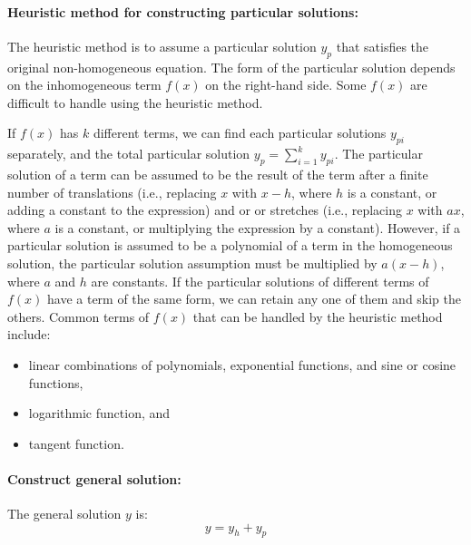 \paragraph{Heuristic method for constructing particular solutions:}

The heuristic method is to assume a particular solution $y_p$ that satisfies the original non-homogeneous equation. The form of the particular solution depends on the inhomogeneous term $f(x)$ on the right-hand side. Some $f(x)$ are difficult to handle using the heuristic method.

If $f(x)$ has $k$ different terms, we can find each particular solutions $y_{pi}$ separately, and the total particular solution $y_p=\sum_{i=1}^ky_{pi}$. The particular solution of a term can be assumed to be the result of the term after a finite number of translations (i.e., replacing $x$ with $x-h$, where $h$ is a constant, or adding a constant to the expression) and or or stretches (i.e., replacing $x$ with $ax$, where $a$ is a constant, or multiplying the expression by a constant). However, if a particular solution is assumed to be a polynomial of a term in the homogeneous solution, the particular solution assumption must be multiplied by $a(x-h)$, where $a$ and $h$ are constants. If the particular solutions of different terms of $f(x)$ have a term of the same form, we can retain any one of them and skip the others. Common terms of $f(x)$ that can be handled by the heuristic method include:
\begin{itemize}
\item linear combinations of polynomials, exponential functions, and sine or cosine functions,
\item logarithmic function, and
\item tangent function.
\end{itemize}

\paragraph{Construct general solution:}

The general solution $y$ is:
\[y=y_h+y_p\]

